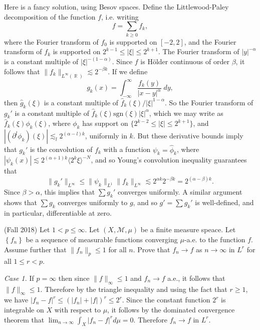 \documentclass[answers]{exam}
\DeclareMathOperator{\RR}{\mathbb{R}}
\begin{document}
\begin{questions}
\begin{parts}
\begin{solution}
    	Here is a fancy solution, using Besov spaces. Define the Littlewood-Paley decomposition of the function $f$, i.e. writing
    	\[ f = \sum_{k \geq 0} f_k, \]
    	where the Fourier transform of $f_0$ is supported on $[-2,2]$, and the Fourier transform of $f_k$ is supported on $2^{k-1} \leq |\xi| \leq 2^{k+1}$. The Fourier transform of $|y|^{-\alpha}$ is a constant multiple of $|\xi|^{-(1 - \alpha)}$. Since $f$ is H\"{o}lder continuous of order $\beta$, it follows that $\| f_k \|_{L^\infty(\RR)} \lesssim 2^{- \beta k}$. If we define
    	\[ g_k(x) = \int_{-\infty}^\infty \frac{f_k(y)}{|x - y|^\alpha}\; dy, \]
    	then $\widehat{g}_k(\xi)$ is a constant multiple of $\widehat{f}_k(\xi) / |\xi|^{1 - \alpha}$. So the Fourier transform of $g_k'$ is a constant multiple of $\widehat{f}_k(\xi) \text{sgn}(\xi) |\xi|^\alpha$, which we may write as $\widehat{f}_k(\xi) \phi_k(\xi)$, where $\phi_k$ has support on $\{ 2^{k-2} \leq |\xi| \leq 2^{k+1} \}$, and $|(\partial^l \phi_k)(\xi)| \lesssim_l 2^{(\alpha - l) k}$, uniformly in $k$. But these derivative bounds imply that $g_k'$ is the convolution of $f_k$ with a function $\psi_k = \widehat{\phi}_k$, where $|\psi_k(x)| \lesssim 2^{(\alpha + 1) k} \langle 2^k \xi \rangle^{-N}$, and so Young's convolution inequality guarantees that
    	\[ \| g_k' \|_{L^\infty} \leq \| \psi_k \|_{L^1} \| f_k \|_{L^\infty} \lesssim 2^{\alpha k} 2^{- \beta k} = 2^{(\alpha - \beta) k}. \]
    	Since $\beta > \alpha$, this implies that $\sum g_k'$ converges uniformly. A similar argument shows that $\sum g_k$ converges uniformly to $g$, and so $g' = \sum g_k'$ is well-defined, and in particular, differentiable at zero.
    \end{solution}
\end{parts}

\question (Fall 2018)
  Let $1<p\leq \infty$. Let $(X,\mathcal{M},\mu)$ be a finite measure speace. Let $\left\{ f_{n} \right\}$ be a sequence of measurable functions converging $\mu$-a.e. to the function $f$. Assume further that $\| f_{n} \|_{p}\leq 1$ for all $n$. Prove that $f_{n}\to f$ as $n\to \infty$ in $L^{r}$ for all $1\leq r<p$.
\begin{solution}
  \textit{Case 1.} If $p=\infty$ then since $\| f \|_{\infty}\leq 1$ and $f_{n}\to f$ a.e., it follows that $\| f \|_{\infty}\leq 1$. Therefore by the triangle inequality and using the fact that $r\geq 1$, we have $|f_{n}-f|^{r}\leq (|f_{n}| + |f| )^{r}\leq 2^{r}$. Since the constant function $2^{r}$ is integrable on $X$ with respect to $\mu$, it follows by the dominated convergence theorem that $\lim_{n\to\infty}\int_{X} |f_{n}-f|^{r}d\mu = 0$. Therefore $f_{n}\to f$ in $L^{r}$.


\end{solution}
\end{questions}
\end{document}
